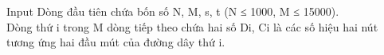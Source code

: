 Input
Dòng đầu tiên chứa bốn số N, M, s, t (N ≤ 1000, M ≤ 15000).
\\Dòng thứ i trong M dòng tiếp theo chứa hai số Di, Ci là các số hiệu hai nút tương ứng hai đầu mút của đường dây thứ i.